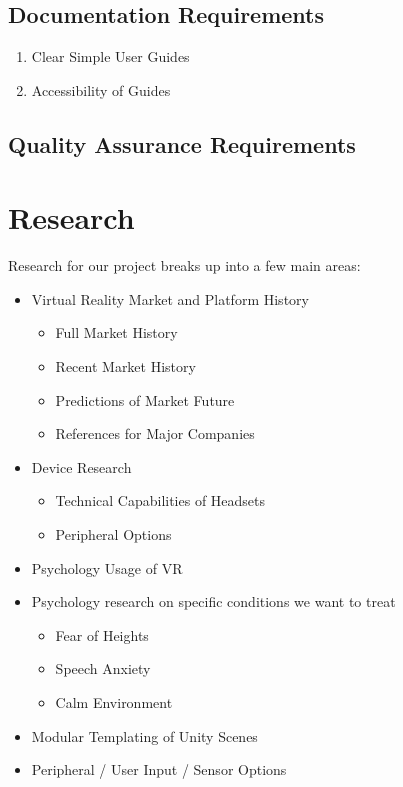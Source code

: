 \documentclass[a4paper,10pt]{article}
\begin{document}
	\subsection{Documentation Requirements}
	\begin{enumerate}
	\item Clear Simple User Guides
	\item Accessibility of Guides
	\end{enumerate}
	\subsection{Quality Assurance Requirements}

	
	
\pagebreak
\section{Research}
Research for our project breaks up into a few main areas:
\begin{itemize}
\item Virtual Reality Market and Platform History
	\begin{itemize}
	\item Full Market History
	\item Recent Market History
	\item Predictions of Market Future
	\item References for Major Companies
	\end{itemize}
\item Device Research
	\begin{itemize}
	\item Technical Capabilities of Headsets
	\item Peripheral Options
	\end{itemize}
\item Psychology Usage of VR
\item Psychology research on specific conditions we want to treat
	\begin{itemize}
	\item Fear of Heights
	\item Speech Anxiety
	\item Calm Environment
	\end{itemize}
\item Modular Templating of Unity Scenes
\item Peripheral / User Input / Sensor Options
\end{itemize}
\pagebreak
\end{document}
